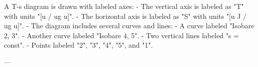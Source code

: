 A T-s diagram is drawn with labeled axes:  
- The vertical axis is labeled as "T" with units "[u / ug u]".  
- The horizontal axis is labeled as "S" with units "[u J / ug u]".  
- The diagram includes several curves and lines:  
  - A curve labeled "Isobare 2, 3".  
  - Another curve labeled "Isobare 4, 5".  
  - Two vertical lines labeled "s = const".  
  - Points labeled "2", "3", "4", "5", and "1".  

---